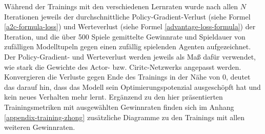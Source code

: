 Während der Trainings mit den verschiedenen Lernraten wurde nach allen $N$ Iterationen jeweils der durchschnittliche Policy-Gradient-Verlust (siehe Formel \ref{a2c-formula-loss}) und Werteverlust (siehe Formel \ref{advantage-loss-formula}) der Iteration, und die über 500 Spiele gemittelte Gewinnrate und Spieldauer von zufälligen Modelltupeln gegen einen zufällig spielenden Agenten aufgezeichnet. Der Policy-Gradient- und Werteverlust werden jeweils als Maß dafür verwendet, wie stark die Gewichte des Actor- bzw. Ciritc-Netzwerks angepasst werden. Konvergieren die Verluste gegen Ende des Trainings in der Nähe von 0, deutet das darauf hin, dass das Modell sein Optimierungspotenzial ausgeschöpft hat und kein neues Verhalten mehr lernt. Ergänzend zu den hier präsentierten Trainingsmetriken mit ausgewählten Gewinnraten finden sich im Anhang \ref{appendix-training-zhong} zusätzliche Diagramme zu den Trainings mit allen weiteren Gewinnraten.


